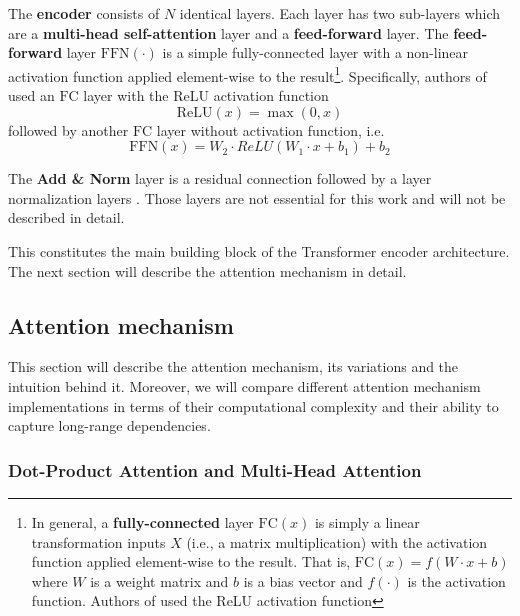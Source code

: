 \documentclass[a4paper, twoside]{report}
\theoremstyle{definition}
\numberwithin{equation}{section}
\begin{document}

The \textbf{encoder} consists of $N$ identical layers. Each layer has two sub-layers which are a
\textbf{multi-head self-attention} layer and
a \textbf{feed-forward} layer.
The \textbf{feed-forward} layer $\text{FFN}(\cdot)$ is a simple fully-connected layer
with a non-linear activation function applied element-wise to the
result\footnote{
    In general, a \textbf{fully-connected} layer $\text{FC}(x)$ is simply a linear transformation inputs $X$ (i.e., a matrix multiplication) with the activation function applied element-wise to the result.
    That is, $\text{FC}(x)=f(W\cdot x + b)$ where $W$ is a weight matrix and $b$ is a bias vector and $f(\cdot)$ is the activation function.
    Authors of \cite{1706.03762} used the ReLU activation function
}.
Specifically, authors of \cite{1706.03762} used an $\text{FC}$ layer with
the ReLU activation function $$\text{ReLU}(x)=\max(0, x)$$
followed by another $\text{FC}$ layer without activation function, i.e.
$$\text{FFN}(x)=W_2 \cdot ReLU(W_1\cdot x+b_1)+b_2$$

The \textbf{Add \& Norm} layer is a residual connection \cite{1512.03385} followed by a layer normalization layers \cite{1607.06450}.
Those layers are not essential for this work and will not be described in detail.

This constitutes the main building block of the Transformer encoder architecture.
The next section will describe the attention mechanism in detail.


\subsection{Attention mechanism} \label{sec:attention_mechanism}

This section will describe the attention mechanism, its variations and the intuition behind it.
Moreover, we will compare different attention mechanism implementations in terms of
their computational complexity and their ability to capture long-range dependencies.

\subsubsection{Dot-Product Attention and Multi-Head Attention}
\end{document}
